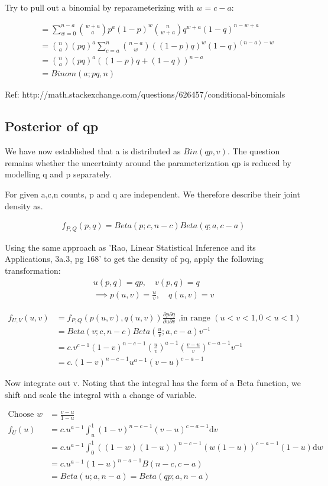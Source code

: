 \documentclass[12pt]{article}
\begin{document}
Try to pull out a binomial by reparameterizing with $ w = c-a$:

\begin{align}
&= \sum_{w=0}^{n-a} {w+a \choose a} p^a(1-p)^w {n \choose w+a} q^{w+a} (1-q)^{n-w+a} \\
&= {n \choose a} (pq)^a \sum_{c=a}^n {n-a \choose w} ((1-p)q)^w (1-q)^{(n-a)-w} \\
&= {n \choose a} (pq)^a ((1-p)q +  (1-q))^{n-a} \\
&= Binom(a;pq,n)
\end{align}

Ref: http://math.stackexchange.com/questions/626457/conditional-binomials

\subsection{Posterior of qp}

We have now established that a is distributed as $Bin(qp,v)$. The question remains whether the uncertainty around the parameterization qp is reduced by modelling q and p separately.

For given a,c,n counts, p and q are independent. We therefore describe their joint density as.

\begin{align}
 f_{P,Q}(p,q) = Beta(p;c,n-c) Beta(q;a,c-a)
\end{align}

Using the same approach as 'Rao, Linear Statistical Inference and its Applications, 3a.3, pg 168' to get the density of pq, apply the following transformation:
\begin{align}
 u(p,q) = qp, \quad v(p,q) = q  \\
 \implies p(u,v) = \frac{u}{v}, \quad q(u,v) = v
\end{align}

\begin{align}
 f_{U,V}(u,v) &= f_{P,Q}(p(u,v),q(u,v)) 
		\frac{\partial p \partial q}{\partial u \partial v} 
		\text{ ,in range }  (u<v<1,0<u<1) \\
 &= Beta(v;c,n-c) Beta(\frac{u}{v};a,c-a) v^{-1} \\
 &= c . v^{c-1} (1-v)^{n-c-1} (\frac{u}{v})^{a-1} (\frac{v - u}{v})^{c-a-1} v^{-1} \\
 &= c . (1-v)^{n-c-1} u^{a-1} (v - u)^{c-a-1}
\end{align}

Now integrate out v. Noting that the integral has the form of a Beta function, we shift and scale the integral with a change of variable.

\begin{align}
\text{Choose }  w &= \frac{v-u}{1-u} \\
f_U(u) &= c.u^{a-1} \int_u^1 (1-v)^{n-c-1} (v - u)^{c-a-1} \mathrm{d}v \\
 &= c.u^{a-1} \int_0^1 ((1-w)(1-u))^{n-c-1} (w(1-u))^{c-a-1} (1-u) \mathrm{d}w \\
 &= c.u^{a-1} (1-u)^{n-a-1} B(n-c,c-a) \\
 &= Beta(u;a,n-a) = Beta(qp;a,n-a) 
\end{align}
\end{document}
